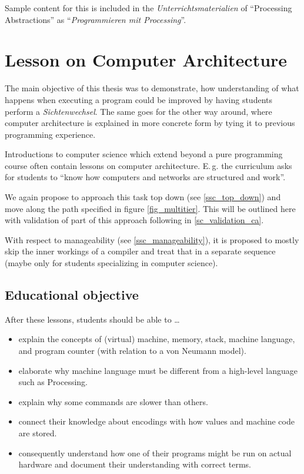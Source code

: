 Sample content for this is included in the \emph{Unterrichtsmaterialien} of  ``Processing Abstractions'' as ``\emph{Programmieren mit Processing}''.



\section{Lesson on Computer Architecture} \label{sc_lesson_ca}

The main objective of this thesis was to demonstrate, how understanding of what happens when executing a program could be improved by having students perform a \emph{Sichtenwechsel}. The same goes for the other way around, where computer architecture is explained in more concrete form by tying it to previous programming experience.

Introductions to computer science which extend beyond a pure programming course often contain lessons on computer architecture. E.\,g. the curriculum \cite[p.\,145]{Erz16} asks for students to ``know how computers and networks are structured and work''.

We again propose to approach this task top down (see \ref{ssc_top_down}) and move along the path specified in figure \ref{fig_multitier}. This will be outlined here with validation of part of this approach following in \ref{sc_validation_ca}.

With respect to manageability (see \ref{ssc_manageability}), it is proposed to mostly skip the inner workings of a compiler and treat that in a separate sequence (maybe only for students specializing in computer science).


\subsection{Educational objective}

After these lessons, students should be able to \dots
\begin{itemize}
\item explain the concepts of (virtual) machine, memory, stack, machine language, and program counter (with relation to a von Neumann model).
\item elaborate why machine language must be different from a high-level language such as Processing.
\item explain why some commands are slower than others.
\item connect their knowledge about encodings with how values and machine code are stored.
\item consequently understand how one of their programs might be run on actual hardware and document their understanding with correct terms.
\end{itemize}


